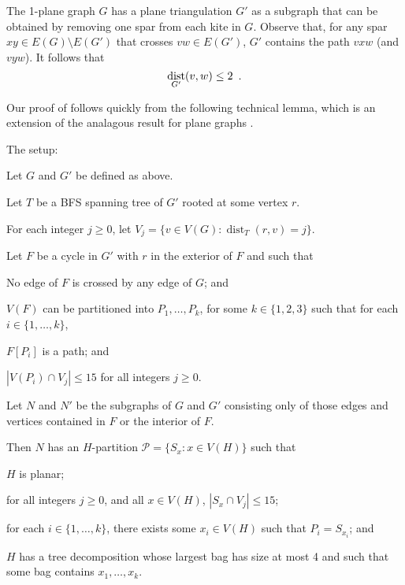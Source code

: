 \documentclass{patmorin}
\DeclareMathOperator{\dist}{dist}
\begin{document}
The 1-plane graph $G$ has a plane triangulation $G'$ as a subgraph that can be obtained by removing one spar from each kite in $G$.  Observe that, for any spar $xy\in E(G)\setminus E(G')$ that crosses $vw\in E(G')$, $G'$ contains the path $vxw$ (and $vyw$).  It follows that 
\begin{equation}
  \dist_{G'}(v,w)\le 2 \enspace . \eqlabel{spar-distance}
\end{equation}

Our proof of  follows quickly from the following technical lemma, which is an extension of the analagous result for plane graphs \cite{dujmovic.joret.ea:planar}.
\begin{lem} The setup:
  \begin{compactenum}
    \item Let $G$ and $G'$ be defined as above.
    \item Let $T$ be a BFS spanning tree of $G'$ rooted at some vertex $r$.
    \item For each integer $j\ge 0$, let $V_j=\{v\in V(G):\dist_T(r,v)=j\}$. 
    \item Let $F$ be a cycle in $G'$ with $r$ in the exterior of $F$ and such that
    \begin{compactenum} 
      \item No edge of $F$ is crossed by any edge of $G$; and
      \item $V(F)$ can be partitioned into $P_1,\ldots,P_k$, for some $k\in\{1,2,3\}$ such that for each $i\in\{1,\ldots,k\}$,
      \begin{compactenum}
        \item $F[P_i]$ is a path; and
        \item $|V(P_i)\cap V_j| \le 15$ for all integers $j\ge 0$.
      \end{compactenum}
    \end{compactenum}
    \item Let $N$ and $N'$ be the subgraphs of $G$ and $G'$ consisting only of those edges and vertices contained in $F$ or the interior of $F$.
  \end{compactenum}
  Then $N$ has an $H$-partition $\mathcal{P}=\{S_x : x\in V(H)\}$ such that
  \begin{compactenum}
    \item $H$ is planar;
    \item for all integers $j\ge 0$, and all $x\in V(H)$, $|S_x\cap V_j|\le 15$; 
    \item for each $i\in\{1,\ldots,k\}$, there exists some $x_i\in V(H)$ such that $P_i=S_{x_i}$; and
    \item $H$ has a tree decomposition whose largest bag has size at most 4 and such that some bag contains $x_1,\ldots,x_k$.
  \end{compactenum}
\end{lem}
\end{document}
